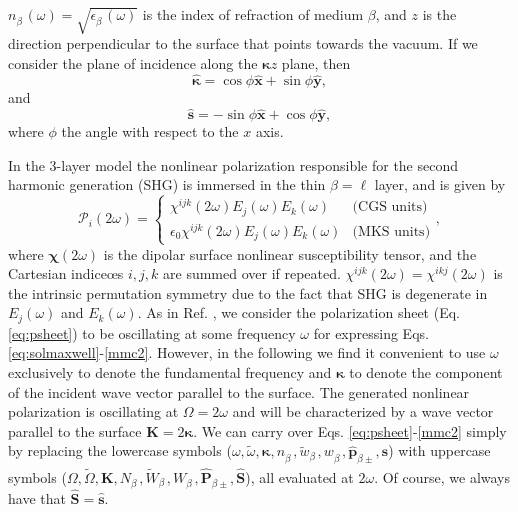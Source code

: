 $n^{\phantom{A}}_{\beta}(\omega)=\sqrt{\epsilon^{\phantom{A}}_{\beta}(\omega)}$
is the index of refraction of medium $\beta$, and $z$ is the direction
perpendicular to the surface that points towards the vacuum. If we consider the
plane of incidence along the $\boldsymbol{\kappa}z$ plane, then
\begin{equation}\label{mc1}
\hat{\boldsymbol{\kappa}} = \cos\phi\hat{\mathbf{x}} + \sin\phi\hat{\mathbf{y}},
\end{equation}
and
\begin{equation}\label{mmc2}
\hat{\mathbf{s}} = -\sin\phi\hat{\mathbf{x}} + \cos\phi\hat{\mathbf{y}},
\end{equation}
where $\phi$ the angle with respect to the $x$ axis.

In the 3-layer model the nonlinear polarization responsible for the second
harmonic generation (SHG) is immersed in the thin $\beta=\ell$ layer, and is
given by
\begin{equation}\label{eq:tres}
\mathcal{P}_{i}(2\omega)=
\left\{
\begin{array}{cc}
\chi^{ijk}(2\omega)E_{j}(\omega)E_{k}(\omega)             & \text{(CGS units)}\\
\epsilon_{0}\chi^{ijk}(2\omega)E_{j}(\omega)E_{k}(\omega) & \text{(MKS units)}
\end{array}
\right.,
\end{equation}
where $\boldsymbol{\chi}(2\omega)$ is the dipolar surface nonlinear
susceptibility tensor, and the Cartesian indiceœs $i,j,k$ are summed over if
repeated. $\chi^{ijk}(2\omega) = \chi^{ikj}(2\omega)$ is the intrinsic
permutation symmetry due to the fact that SHG is degenerate in $E_{j}(\omega)$
and $E_{k}(\omega)$. As in Ref. \cite{mizrahiJOSA88}, we consider the
polarization sheet (Eq. \eqref{eq:psheet}) to be oscillating at some frequency
$\omega$ for expressing Eqs. \eqref{eq:solmaxwell}-\eqref{mmc2}. However, in the
following we find it convenient to use $\omega$ exclusively to denote the
fundamental frequency and $\boldsymbol{\kappa}$ to denote the component of the
incident wave vector parallel to the surface. The generated nonlinear
polarization is oscillating at $\Omega = 2\omega$ and will be characterized by a
wave vector parallel to the surface $\mathbf{K} = 2\boldsymbol{\kappa}$. We can
carry over Eqs. \eqref{eq:psheet}-\eqref{mmc2} simply by replacing the lowercase
symbols ($\omega,\tilde{\omega},\boldsymbol{\kappa},n^{\phantom{A}}_{\beta},
\tilde{w}^{\phantom{A}}_{\beta},w^{\phantom{A}}_{\beta},
\hat{\mathbf{p}}_{\beta\pm},\hat{\mathbf{s}}$) with uppercase symbols
($\Omega,\tilde{\Omega},\mathbf{K},N^{\phantom{A}}_{\beta},
\tilde{W}^{\phantom{A}}_{\beta},W^{\phantom{A}}_{\beta},
\hat{\mathbf{P}}_{\beta\pm},\hat{\mathbf{S}}$), all evaluated at $2\omega$. Of
course, we always have that $\hat{\mathbf{S}}=\hat{\mathbf{s}}$.

